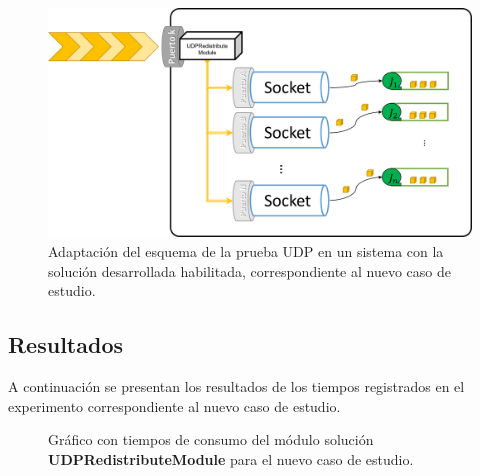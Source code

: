 \begin{figure}[!h]
	\centering
	\includegraphics[scale=.5]{imagenes/adaptacioncasoestudio.png}
	\caption{Adaptación del esquema de la prueba UDP en un sistema con la solución desarrollada habilitada, correspondiente al nuevo caso de estudio.}
	\label{fig:casoPruebaModulo}
\end{figure}

\subsection{Resultados}
A continuación se presentan los resultados de los tiempos registrados en el experimento correspondiente al nuevo caso de estudio.

\begin{figure}[h!]
	\centering
	\hspace*{\fill}
	\hfill
	\caption{Gráfico con tiempos de consumo del módulo solución \textbf{UDPRedistributeModule} para el nuevo caso de estudio.}
	\label{fig:resultadoMiModuloMinMax}
	\hspace*{\fill}
\end{figure}

